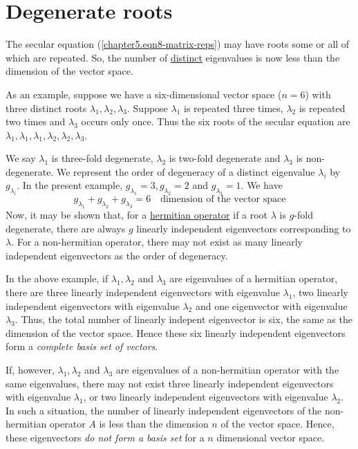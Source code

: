	\section{Degenerate roots}
	The secular equation (\ref{chapter5.eqn8-matrix-reps}) may have roots some or all of which are repeated. So, the number of \underline{distinct} eigenvalues is now less than the dimension of the vector space.
	
	
	As an example, suppose we have a six-dimensional vector space ($n=6$) with three distinct roots $\lambda_1, \lambda_2, \lambda_3$. Suppose $\lambda_1$ is repeated three times, $\lambda_2$ is repeated two times and $\lambda_3$ occurs only once. Thus the six roots of the secular equation are $\lambda_1, \lambda_1, \lambda_1, \lambda_2, \lambda_2, \lambda_3$.
	
	
	
	
	
	We say $\lambda_1$ is three-fold degenerate, $\lambda_2$ is two-fold degenerate and $\lambda_3$ is non-degenerate. We represent the order of degeneracy of a distinct eigenvalue $\lambda_i$ by $g_{\lambda_i}$. In the present example, $g_{\lambda_1}=3, g_{\lambda_2}=2$ and $ g_{\lambda_3}=1$. We have
	\begin{equation}
		g_{\lambda_1} + g_{\lambda_2} + g_{\lambda_3} = 6 \quad \text{dimension of the vector space}
	\end{equation}
	Now, it may be shown that, for a \underline{hermitian operator} if a root $\lambda$ is $g$-fold degenerate, there are always $g$ linearly independent eigenvectors corresponding to $\lambda$. For a non-hermitian operator, there may not exist as many linearly independent eigenvectors as the order of degeneracy.
	
	
	
	In the above example, if $\lambda_1, \lambda_2$ and $\lambda_3$ are eigenvalues of a hermitian operator, there are three linearly independent eigenvectors with eigenvalue $\lambda_1$, two linearly independent eigenvectors with eigenvalue $\lambda_2$ and one eigenvector with eigenvalue $\lambda_3$. Thus, the total number of linearly indepent eigenvector is six, the same as the dimension of the vector space. Hence these six linearly independent eigenvectors form a \textit{complete basis set of vectors}.
	
	
	
	If, however, $\lambda_1, \lambda_2$ and $\lambda_3$ are eigenvalues of a non-hermitian operator with the same eigenvalues, there may not exist three linearly independent eigenvectors with eigenvalue $\lambda_1$, or  two linearly independent eigenvectors with eigenvalue $\lambda_2$. In such a situation, the number of linearly independent eigenvectors of the non-hermitian operator $A$ is less than the dimension $n$ of the vector space. Hence, these eigenvectors \textit{do not form a basis set} for a $n$ dimensional vector space.
	
